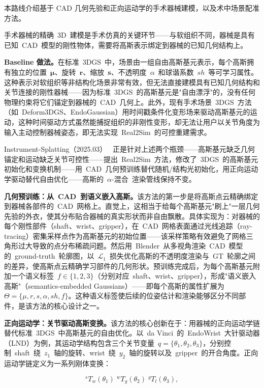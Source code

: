 本路线介绍基于 CAD 几何先验和正向运动学的手术器械建模，以及术中场景配准方法。

手术器械的精确~3D~建模是手术仿真的关键环节——与软组织不同，器械是具有已知~CAD~模型的刚性物体，需要将高斯表示绑定到器械的已知几何结构上。

\textbf{Baseline 做法。}在标准~3DGS~中，场景由一组自由高斯基元表示，每个高斯拥有独立的位置~$\bm{\mu}$、旋转~$\bm{r}$、缩放~$\bm{s}$、不透明度~$\alpha$~和球谐系数~$sh$~等可学习属性。这种表示对软组织等非结构化场景非常有效，但无法直接建模具有已知几何结构和关节连接的刚性器械——因为标准~3DGS~的高斯基元是"自由漂浮"的，没有任何物理约束将它们锚定到器械的~CAD~几何上。此外，现有手术场景~3DGS~方法（如~Deform3DGS、EndoGaussian）用时间戳条件化变形场来驱动高斯基元的运动，这种时间驱动方式虽然能捕捉组织的非刚性变形，却无法让用户以关节角度为输入主动控制器械姿态，即无法实现~Real2Sim~的可控重建需求。

Instrument-Splatting（2025.03）~\cite{2503_04082} 正是针对上述两个瓶颈——高斯基元缺乏几何锚定和运动缺乏关节可控性——提出~Real2Sim~方法，修改了~3DGS~的高斯基元初始化和变换机制——用~CAD~几何预训练替代随机/结构光初始化，用正向运动学驱动替代自由优化——高斯的~$\alpha$-混合~渲染管线保持不变。

\textbf{几何预训练：从~CAD~到语义嵌入高斯。}该方法的第一步是将高斯点云精确绑定到器械各部件的~CAD~网格上。直觉上，这相当于给每个高斯基元"刷上"一层几何先验的外衣，使其分布贴合器械的真实形状而非自由飘散。具体实现为：对器械的每个刚性部件（shaft、wrist、gripper），在~CAD~网格表面通过光线追踪（ray-tracing）密集采样点作为高斯基元的初始位置——该采样策略有效避免了网格三角形过大导致的点分布稀疏问题。然后用~Blender~从多视角渲染~CAD~模型的~ground-truth~轮廓图，以~$\mathcal{L}_1$~损失优化高斯的不透明度渲染与~GT~轮廓之间的差异，使高斯点云精确学习部件的几何形状。预训练完成后，为每个高斯基元附加一个语义标签~$f \in \{1,2,3\}$（分别对应~shaft、wrist、gripper），形成"语义嵌入高斯"（semantics-embedded Gaussians）——即每个高斯的属性扩展为~$\Theta = \{\mu, r, s, \alpha, sh, f\}$。这种语义标签使后续的位姿估计和渲染能够区分不同部件，是该方法的核心设计之一。

\textbf{正向运动学：关节驱动高斯变换。}该方法的核心创新在于：用器械的正向运动学链替代标准~3DGS~中高斯基元的自由优化。以~da Vinci~的~EndoWrist~大针驱动器（LND）为例，其运动学结构包含三个关节变量~$q = \{\theta_1, \theta_2, \theta_3\}$，分别控制~shaft~绕~$z_1$~轴的旋转、wrist~绕~$y_2$~轴的旋转以及~gripper~的开合角度。正向运动学链定义为一系列刚体变换：

\begin{equation}
{}^{s}T_w(\theta_1)\;{}^{w}T_{g}(\theta_2)\;{}^{g}T_{l}(\theta_3),
\end{equation}

